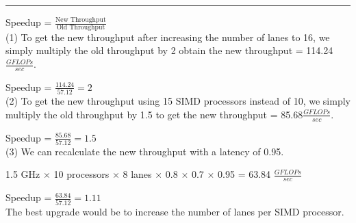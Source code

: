 \documentclass[11pt]{exam}
\newcounter{questionCounter}
\newcounter{partCounter}[questionCounter]
\newenvironment{namedquestion}[1]{%
    \addtocounter{questionCounter}{1}%
    \setcounter{partCounter}{0}%
    \vspace{.2in}%
        \noindent{\bf #1}%
    \vspace{0.3em} \hrule \vspace{.1in}%
}{}
\begin{document}
\begin{namedquestion}{Problem 4.13b}
Speedup = $\frac{\text{New Throughput}}{\text{Old Throughput}}$\\

(1) To get the new throughput after increasing the number of lanes to 16, we simply multiply the old throughput by 2 obtain the new throughput = 114.24$\frac{GFLOPs}{sec}$. 

Speedup = $\frac{114.24}{57.12} = 2$\\

(2) To get the new throughput using 15 SIMD processors instead of 10, we simply multiply the old throughput by 1.5 to get the new throughput = 85.68$\frac{GFLOPs}{sec}$.

Speedup = $\frac{85.68}{57.12} = 1.5$\\

(3) We can recalculate the new throughput with a latency of 0.95. 

1.5 GHz $\times$ 10 processors $\times$ 8 lanes $\times$ 0.8 $\times$ 0.7 $\times$ 0.95 = 63.84 $\frac{GFLOPs}{sec}$

Speedup = $\frac{63.84}{57.12} = 1.11$\\

The best upgrade would be to increase the number of lanes per SIMD processor. 

\end{namedquestion}
\end{document}
